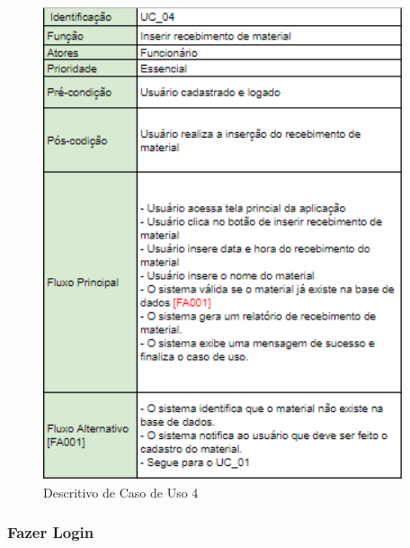 \documentclass[rascunho,xindy,acronym,symbols]{fei}
\begin{document}
\begin{figure}[H]
    \centering
    \includegraphics[scale=0.6, width=300pt]{./Images/Descritivos/UC4.png}
    \caption{Descritivo de Caso de Uso 4}
     \label{fig:desc_uc4}
\end{figure}

\subsubsection{Fazer Login}
\end{document}
